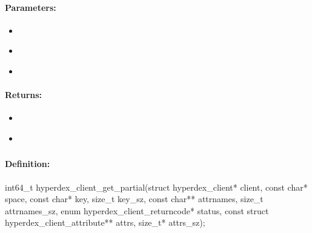 \paragraph{Parameters:}
\begin{itemize}[noitemsep]
\item {}\\

\item {}\\

\item {}\\

\end{itemize}

\paragraph{Returns:}
\begin{itemize}[noitemsep]
\item {}\\

\item {}\\

\end{itemize}

\pagebreak
\subsubsection{}
\label{api:c:get_partial}


\paragraph{Definition:}
\begin{ccode}
int64_t hyperdex_client_get_partial(struct hyperdex_client* client,
        const char* space,
        const char* key, size_t key_sz,
        const char** attrnames, size_t attrnames_sz,
        enum hyperdex_client_returncode* status,
        const struct hyperdex_client_attribute** attrs, size_t* attrs_sz);
\end{ccode}

